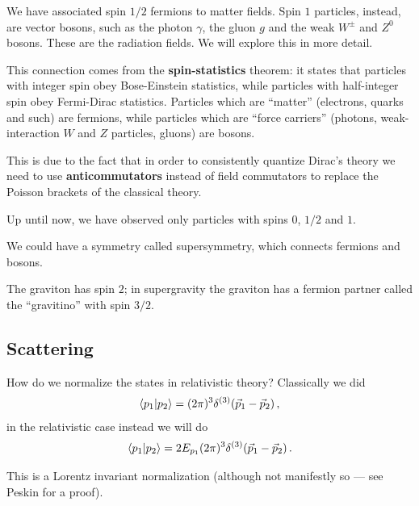 \documentclass[main.tex]{subfiles}
\begin{document}


We have associated spin \(1/2\) fermions to matter fields. 
Spin \(1\) particles, instead, are vector bosons, such as the photon \(\gamma\), the gluon \(g\) and the weak \(W^{\pm}\) and \(Z^{0}\) bosons. These are the radiation fields.  
We will explore this in more detail. 

This connection comes from the \textbf{spin-statistics} theorem: it states that particles with integer spin obey Bose-Einstein statistics, while particles with half-integer spin obey Fermi-Dirac statistics.
Particles which are ``matter'' (electrons, quarks and such) are fermions, while particles which are ``force carriers'' (photons, weak-interaction \(W\) and \(Z\) particles,  gluons) are bosons.

This is due to the fact that in order to consistently quantize Dirac's theory we need to use \textbf{anticommutators} instead of field commutators to replace the Poisson brackets of the classical theory. 

Up until now, we have observed only particles with spins \(0\), \(1/2\) and \(1\). 

We could have a symmetry called supersymmetry, which connects fermions and bosons.

The graviton has spin \(2\); in supergravity the graviton has a fermion partner called the ``gravitino'' with spin \(3/2\). 

\subsection{Scattering}

How do we normalize the states in relativistic theory? 
Classically we did 
%
\begin{align}
\braket{p_1 }{p_2  } = (2 \pi )^3 \delta^{(3)} (\vec{p}_{1} - \vec{p}_{2})
\,,
\end{align}
%
in the relativistic case instead we will do 
%
\begin{align}
\braket{p_1 }{p_2  } = 2 E_{p_1 } (2 \pi )^3 \delta^{(3)} (\vec{p}_{1} - \vec{p}_{2})
\,.
\end{align}

This is a Lorentz invariant normalization (although not manifestly so --- see Peskin \cite[sec.\ 3.5]{peskinConceptsElementaryParticle2019} for a proof). 
\end{document}
